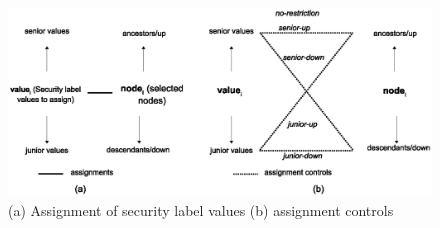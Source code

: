  	\begin{figure} [t]
 		\centering
 		\includegraphics[width=1\textwidth]{NSS16/assignment-control}
 		\caption{(a) Assignment of security label values (b) assignment controls}
 		\label{fig:restriction-types}
 	\end{figure}
 